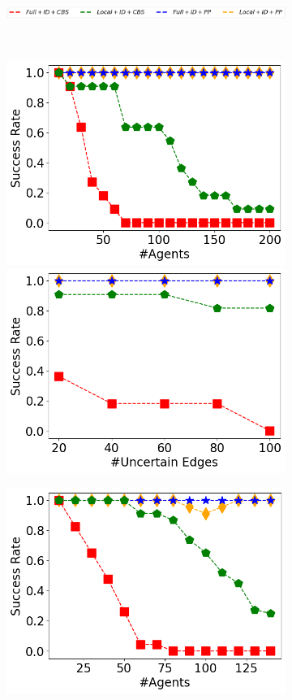 \documentclass[letterpaper]{article} %
\def\
UrlFont{\rm}  %
\theoremstyle{definition}
\begin{document}
\begin{figure}[tbh]
    \begin{subfigure}[b]{0.9\columnwidth}\centering  
      \includegraphics[width=\columnwidth]{Figures/legends_success_rates.png}
    \end{subfigure}\\
        \begin{subfigure}[b]{\columnwidth}\centering  
      \includegraphics[width=0.47\columnwidth]{Figures/maze/mixed_small_figures/Success-Rate(k)_pos=100_ID_ONLY.png}
      \includegraphics[width=0.47\columnwidth]{Figures/maze/mixed_small_figures/Success-Rate(UEs)_k=50_ID_ONLY.png}
    \end{subfigure}
    \begin{subfigure}[b]{\columnwidth}\centering  
      \includegraphics[width=0.47\columnwidth]{Figures/warehouse/mixed_small_figures/Success-Rate(k)_pos=100_ID_ONLY.png}

\end{subfigure}
\end{figure}
\end{document}
